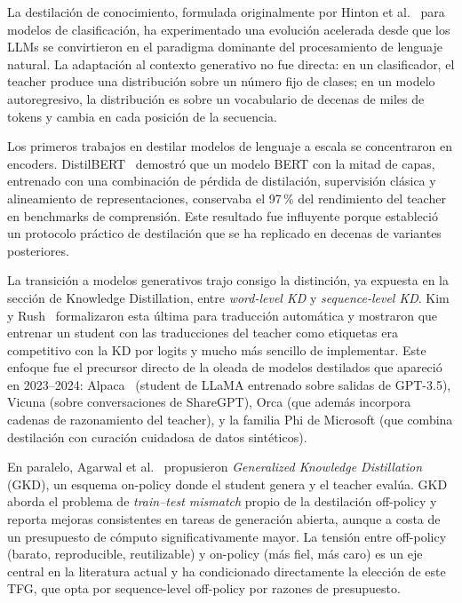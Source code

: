 La destilación de conocimiento, formulada originalmente por Hinton et al.~\cite{hinton2015distilling} para modelos de clasificación, ha experimentado una evolución acelerada desde que los LLMs se convirtieron en el paradigma dominante del procesamiento de lenguaje natural. La adaptación al contexto generativo no fue directa: en un clasificador, el teacher produce una distribución sobre un número fijo de clases; en un modelo autoregresivo, la distribución es sobre un vocabulario de decenas de miles de tokens y cambia en cada posición de la secuencia.

Los primeros trabajos en destilar modelos de lenguaje a escala se concentraron en encoders. DistilBERT~\cite{sanh2019distilbert} demostró que un modelo BERT con la mitad de capas, entrenado con una combinación de pérdida de distilación, supervisión clásica y alineamiento de representaciones, conservaba el 97\,\% del rendimiento del teacher en benchmarks de comprensión. Este resultado fue influyente porque estableció un protocolo práctico de destilación que se ha replicado en decenas de variantes posteriores.

La transición a modelos generativos trajo consigo la distinción, ya expuesta en la sección de Knowledge Distillation, entre \emph{word-level KD} y \emph{sequence-level KD}. Kim y Rush~\cite{kim2016sequence} formalizaron esta última para traducción automática y mostraron que entrenar un student con las traducciones del teacher como etiquetas era competitivo con la KD por logits y mucho más sencillo de implementar. Este enfoque fue el precursor directo de la oleada de modelos destilados que apareció en 2023--2024: Alpaca~\cite{taori2023alpaca} (student de LLaMA entrenado sobre salidas de GPT-3.5), Vicuna (sobre conversaciones de ShareGPT), Orca (que además incorpora cadenas de razonamiento del teacher), y la familia Phi de Microsoft (que combina destilación con curación cuidadosa de datos sintéticos).

En paralelo, Agarwal et al.~\cite{agarwal2024gkd} propusieron \textit{Generalized Knowledge Distillation} (GKD), un esquema on-policy donde el student genera y el teacher evalúa. GKD aborda el problema de \textit{train--test mismatch} propio de la destilación off-policy y reporta mejoras consistentes en tareas de generación abierta, aunque a costa de un presupuesto de cómputo significativamente mayor. La tensión entre off-policy (barato, reproducible, reutilizable) y on-policy (más fiel, más caro) es un eje central en la literatura actual y ha condicionado directamente la elección de este TFG, que opta por sequence-level off-policy por razones de presupuesto.

